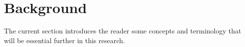 \section{Background} \label{sec:background}

The current section introduces the reader some concepts and terminology that will be essential further in this research.




